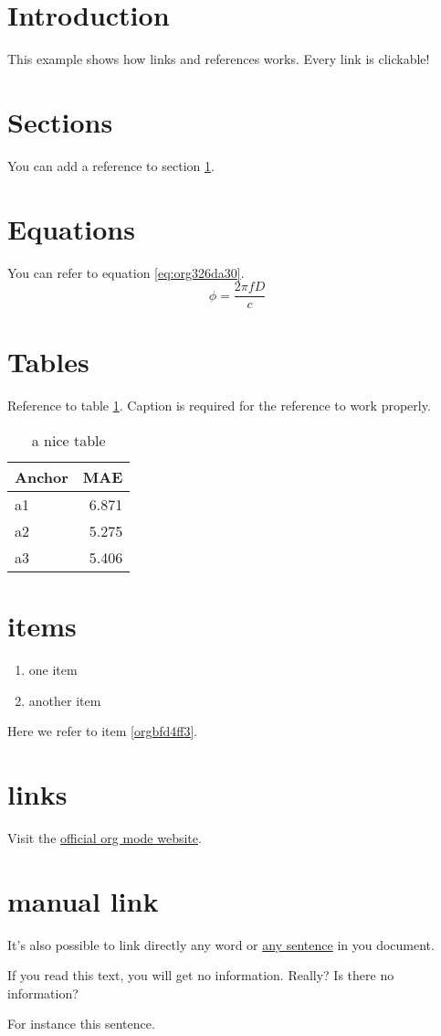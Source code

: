 


\section{Introduction}
\label{sec:orgbd8f858}
This example shows how links and references works.
Every link is clickable!

\section{Sections}
\label{sec:org7470c43}
You can add a reference to section \ref{sec:orgbd8f858}.

\section{Equations}
\label{sec:orgc0938b6}
You can refer to equation \ref{eq:org326da30}.
\begin{equation}
\label{eq:org326da30}
\phi = \frac{2\pi fD}{c}
\end{equation}

\section{Tables}
\label{sec:orgfa0548f}
Reference to table \ref{tab:org78d1e65}.
Caption is required for the reference to work properly.

\begin{table}[htbp]
\caption{\label{tab:org78d1e65}
a nice table}
\centering
\begin{tabular}{lr}
Anchor & MAE\\
\hline
a1 & 6.871\\
a2 & 5.275\\
a3 & 5.406\\
\end{tabular}
\end{table}

\section{items}
\label{sec:orge221428}
\begin{enumerate}
\item one item
\item \label{orgbfd4ff3}another item
\end{enumerate}
Here we refer to item \ref{orgbfd4ff3}.

\section{links}
\label{sec:org093a3fa}
Visit the \href{https://orgmode.org/}{official org mode website}.

\section{manual link}
\label{sec:org3b490ad}
It's also possible to link directly any word
or \hyperlink{thesentence}{any sentence} in you document.

If you read this text, you will get no information.  Really?
Is there no information?

For instance \hypertarget{thesentence}{this sentence}.


